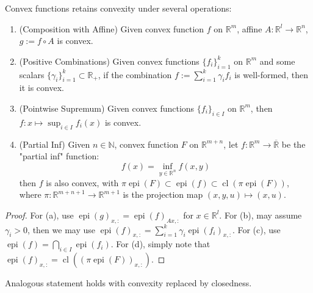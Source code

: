 \begin{prop}\label{prop:021-yoga-convex-functions}
	Convex functions retains convexity under several operations:
	\begin{enumerate}[label=(\alph*)]
		\item (Composition with Affine) Given convex function $f$ on $\mathbb{R}^m$, affine $A:\mathbb{R}^l\to \mathbb{R}^n$, $g:=f\circ A$ is convex.
		\item (Positive Combinations) Given convex functions $\{f_i\}_{i=1}^k$ on $\mathbb{R}^m$ and some scalars $\{\gamma_i\}_{i=1}^k\subset \mathbb{R}_{+}$, if the combination $f:=\sum_{i=1}^k \gamma_i f_i$ is well-formed, then it is convex.
		\item (Pointwise Supremum) Given convex functions $\{f_i\}_{i\in I}$ on $\mathbb{R}^m$, then $f:x\mapsto\sup_{i\in I}f_i(x)$ is convex.
		\item (Partial Inf) Given $n\in \mathbb{N}$, convex function $F$ on $\mathbb{R}^{m+n}$, let $f:\mathbb{R}^m\to \overline{\mathbb{R}}$ be the "partial inf" function:
		      \[
			      f(x)=\underset{y\in \mathbb{R}^n}{\operatorname{inf}}f(x,y)
		      \]
		      then $f$ is also convex, with $\pi \operatorname{epi}(F)\subset \operatorname{epi}(f)\subset \operatorname{cl}(\pi \operatorname{epi}(F))$, where $\pi:\mathbb{R}^{m+n+1}\to \mathbb{R}^{m+1}$ is the projection map $(x,y,u)\mapsto (x,u)$.
	\end{enumerate}
\end{prop}

\begin{proof}
	For (a), use $\operatorname{epi}(g)_{x,:}=\operatorname{epi}(f)_{Ax,:}$ for $x\in \mathbb{R}^l$. For (b), may assume $ \gamma_i>0$, then we may use $\operatorname{epi}(f)_{x,:}=\sum_{i=1}^k\gamma_i\operatorname{epi}(f_i)_{x,:}$.	For (c), use $\operatorname{epi}(f)=\bigcap_{i\in I}\operatorname{epi}(f_i)$. For (d), simply note that $\operatorname{epi}(f)_{x,:}=\operatorname{cl}((\pi\operatorname{epi}(F))_{x,:})$.
\end{proof}

\begin{rmrk}
	Analogous statement holds with convexity replaced by closedness.
\end{rmrk}


